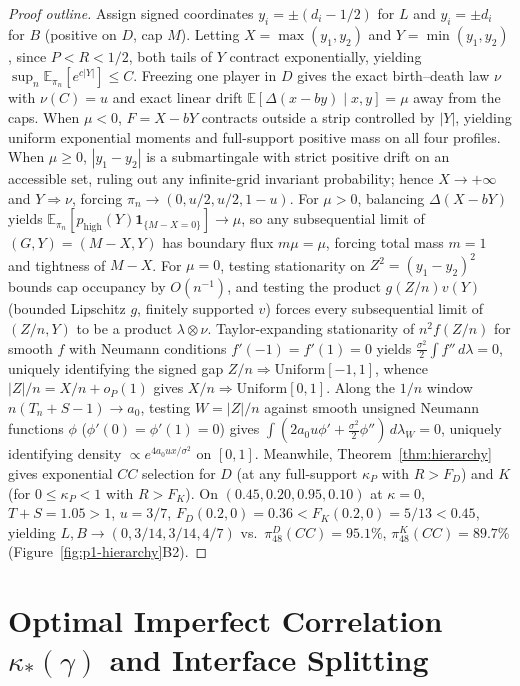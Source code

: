 \documentclass[11pt,reqno]{amsart}
\theoremstyle{definition}
\theoremstyle{remark}
\newcommand{\E}{\mathbb{E}}
\newcommand{\one}{\mathbf{1}}
\begin{document}
\begin{proof}[Proof outline]
Assign signed coordinates $y_i = \pm(d_i - 1/2)$ for $L$ and $y_i = \pm d_i$ for $B$ (positive on $D$, cap $M$). Letting $X = \max(y_1,y_2)$ and $Y = \min(y_1,y_2)$, since $P < R < 1/2$, both tails of $Y$ contract exponentially, yielding $\sup_n \E_{\pi_n}[e^{c|Y|}] \le C$. Freezing one player in $D$ gives the exact birth--death law $\nu$ with $\nu(C) = u$ and exact linear drift $\E[\Delta(x - b y) \mid x,y] = \mu$ away from the caps. When $\mu < 0$, $F = X - bY$ contracts outside a strip controlled by $|Y|$, yielding uniform exponential moments and full-support positive mass on all four profiles. When $\mu \ge 0$, $|y_1-y_2|$ is a submartingale with strict positive drift on an accessible set, ruling out any infinite-grid invariant probability; hence $X \to +\infty$ and $Y \Rightarrow \nu$, forcing $\pi_n \to (0,u/2,u/2,1-u)$. For $\mu > 0$, balancing $\Delta(X - bY)$ yields $\E_{\pi_n}[p_{\mathrm{high}}(Y)\one_{\{M-X=0\}}] \to \mu$, so any subsequential limit of $(G, Y) = (M-X, Y)$ has boundary flux $m\mu = \mu$, forcing total mass $m = 1$ and tightness of $M-X$. For $\mu = 0$, testing stationarity on $Z^2 = (y_1-y_2)^2$ bounds cap occupancy by $O(n^{-1})$, and testing the product $g(Z/n)v(Y)$ (bounded Lipschitz $g$, finitely supported $v$) forces every subsequential limit of $(Z/n, Y)$ to be a product $\lambda \otimes \nu$. Taylor-expanding stationarity of $n^2 f(Z/n)$ for smooth $f$ with Neumann conditions $f'(-1)=f'(1)=0$ yields $\frac{\sigma^2}{2}\int f''\,d\lambda = 0$, uniquely identifying the signed gap $Z/n \Rightarrow \mathrm{Uniform}[-1,1]$, whence $|Z|/n = X/n + o_P(1)$ gives $X/n \Rightarrow \mathrm{Uniform}[0,1]$. Along the $1/n$ window $n(T_n+S-1)\to a_0$, testing $W = |Z|/n$ against smooth unsigned Neumann functions $\phi$ ($\phi'(0)=\phi'(1)=0$) gives $\int (2a_0 u \phi' + \frac{\sigma^2}{2}\phi'')\,d\lambda_W = 0$, uniquely identifying density $\propto e^{4a_0 u x/\sigma^2}$ on $[0,1]$. Meanwhile, Theorem~\ref{thm:hierarchy} gives exponential $CC$ selection for $D$ (at any full-support $\kappa_P$ with $R > F_D$) and $K$ (for $0 \le \kappa_P < 1$ with $R > F_K$). On $(0.45,0.20,0.95,0.10)$ at $\kappa=0$, $T+S=1.05>1$, $u=3/7$, $F_D(0.2,0)=0.36 < F_K(0.2,0)=5/13 < 0.45$, yielding $L,B \to (0,3/14,3/14,4/7)$ vs.\ $\pi_{48}^D(CC)=95.1\%$, $\pi_{48}^K(CC)=89.7\%$ (Figure~\ref{fig:p1-hierarchy}B2).
\end{proof}

\section{Optimal Imperfect Correlation \texorpdfstring{$\kappa_*(\gamma)$}{kappa*(gamma)} and Interface Splitting}\label{sec:unequal}
\end{document}

